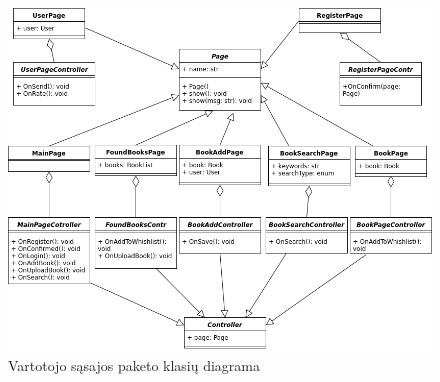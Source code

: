 \documentclass{VUMIFPSkursinis}
\begin{document}
		\begin{figure}[H]
			\centering
			\includegraphics[scale=0.6]{img/UI-ClassDiagram.png}
			\caption{Vartotojo sąsajos paketo klasių diagrama}
			\label{img:psi2-ui-class}
		\end{figure}
\end{document}
